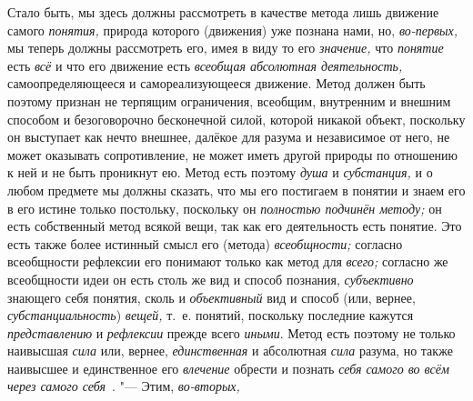 Стало быть, мы здесь должны рассмотреть в качестве метода лишь
движение самого {\em понятия,}
природа которого (движения) уже познана нами, но,
{\em во-первых,} мы
теперь должны рассмотреть его, имея в виду то его
{\em значение,} что
{\em понятие} есть
{\em всё} и что его
движение есть {\em всеобщая абсолютная
деятельность,} самоопределяющееся и самореализующееся
движение. Метод должен быть поэтому признан не терпящим ограничения,
всеобщим, внутренним и внешним способом и безоговорочно бесконечной силой,
которой никакой объект, поскольку он выступает как нечто внешнее, далёкое
для разума и независимое от него, не может оказывать сопротивление, не
может иметь другой природы по отношению к ней и не быть проникнут ею. Метод
есть поэтому {\em душа} и {\em субстанция,} и о любом предмете мы должны
сказать, что мы его постигаем в понятии и знаем его в его истине только
постольку, поскольку он {\em полностью подчинён методу;} он есть собственный
метод всякой вещи, так как его деятельность есть понятие. Это есть также более
истинный смысл его (метода) {\em всеобщности;} согласно всеобщности рефлексии
его понимают только как метод для {\em всего;} согласно же всеобщности идеи он
есть столь же вид и способ познания, {\em субъективно} знающего себя понятия,
сколь и {\em объективный} вид и способ (или, вернее, {\em субстанциальность})
{\em вещей,} т.~е. понятий, поскольку последние кажутся {\em представлению}
и {\em рефлексии} прежде всего {\em иными}. Метод есть поэтому не только
наивысшая {\em сила} или, вернее, {\em единственная} и абсолютная {\em сила}
разума, но также наивысшее и единственное его {\em влечение} обрести и познать
{\em себя самого во всём через самого себя~}. "--- Этим, {\em во-вторых,}

